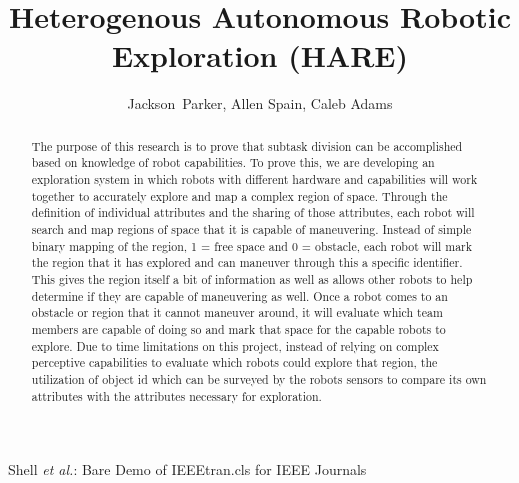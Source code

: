 \documentclass[conference]{IEEEtran}
\begin{document}
\title{Heterogenous Autonomous Robotic Exploration (HARE)}

\author{Jackson~Parker, Allen Spain, Caleb Adams}

%
{Shell \MakeLowercase{\textit{et al.}}: Bare Demo of IEEEtran.cls for IEEE Journals}











\maketitle

\begin{abstract}
  The purpose of this research is to prove that subtask division can be accomplished based on knowledge of robot capabilities. To prove this, we are developing an exploration system in which robots with different hardware and capabilities will work together to accurately explore and map a complex region of space. Through the definition of individual attributes and the sharing of those attributes, each robot will search and map regions of space that it is capable of maneuvering. Instead of simple binary mapping of the region, 1 = free space and 0 = obstacle, each robot will mark the region that it has explored and can maneuver through this a specific identifier. This gives the region itself a bit of information as well as allows other robots to help determine if they are capable of maneuvering as well.
  Once a robot comes to an obstacle or region that it cannot maneuver around, it will evaluate which team members are capable of doing so and mark that space for the capable robots to explore. Due to time limitations on this project, instead of relying on complex perceptive capabilities to evaluate which robots could explore that region, the utilization of object id which can be surveyed by the robots sensors to compare its own attributes with the attributes necessary for exploration.
\end{abstract}
\end{document}
